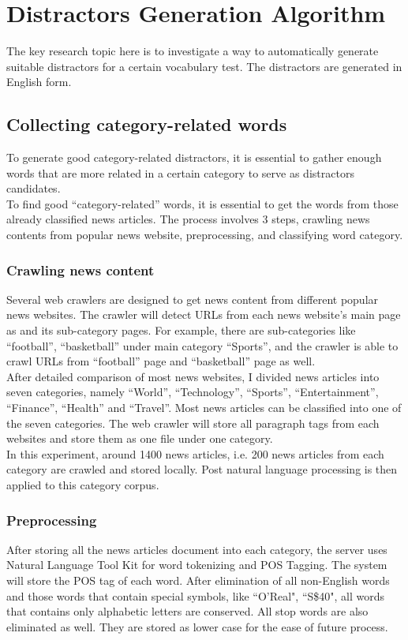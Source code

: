 \section{Distractors Generation Algorithm}
The key research topic here is to investigate a way to automatically generate suitable distractors for a certain vocabulary test. The distractors are generated in English form.
\subsection{Collecting category-related words}
To generate good category-related distractors, it is essential to gather enough words that are more related in a certain category to serve as distractors candidates.
\\
To find good “category-related” words, it is essential to get the words from those already classified news articles. The process involves 3 steps, crawling news contents from popular news website, preprocessing, and classifying word category.
\\
\subsubsection{Crawling news content}
Several web crawlers are designed to get news content from different popular news websites. The crawler will detect URLs from each news website’s main page as and its sub-category pages. For example, there are sub-categories like “football”, “basketball” under main category “Sports”, and the crawler is able to crawl URLs from “football” page and “basketball” page as well. 
\\
After detailed comparison of most news websites, I divided news articles into seven categories, namely “World”, “Technology”, “Sports”, “Entertainment”, “Finance”, “Health” and “Travel”. Most news articles can be classified into one of the seven categories. The web crawler will store all paragraph tags from each websites and store them as one file under one category. 
\\
In this experiment, around 1400 news articles, i.e. 200 news articles from each category are crawled and stored locally. Post natural language processing is then applied to this category corpus.
\\
\subsubsection{Preprocessing}
After storing all the news articles document into each category, the server uses Natural Language Tool Kit \cite{edw09} for word tokenizing and POS Tagging. The system will store the POS tag of each word. After elimination of all non-English words and those words that contain special symbols, like ``O’Real", ``S\$40", all words that contains only alphabetic letters are conserved. All stop words are also eliminated as well. They are stored as lower case for the ease of future process.
\\
